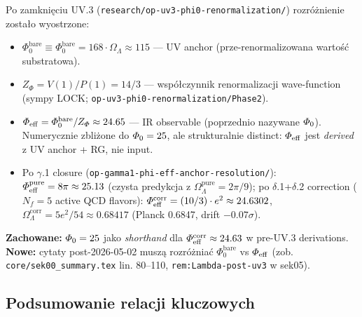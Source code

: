 \begin{remark}%
\label{rem:slownik-uv3-update}
Po zamknięciu UV.3 (\texttt{research/op-uv3-phi0-renormalization/}) rozróżnienie zostało wyostrzone:
\begin{itemize}[nosep]
  \item $\Phi_0^{\text{bare}} \equiv \Phi_0^{\text{bare}} = 168\cdot\Omega_\Lambda \approx 115$
        --- UV anchor (prze-renormalizowana wartość substratowa).
  \item $Z_\Phi = V(1)/P(1) = 14/3$ --- współczynnik renormalizacji
        wave-function (sympy LOCK; \texttt{op-uv3-phi0-renormalization/Phase2}).
  \item $\varPhi_{\mathrm{eff}} = \varPhi_0^{\text{bare}}/Z_\varPhi \approx 24.65$ --- IR observable
        (poprzednio nazywane \emph{$\varPhi_0$}). Numerycznie zbliżone
        do $\varPhi_0=25$, ale strukturalnie distinct: $\varPhi_{\mathrm{eff}}$ jest
        \emph{derived} z UV anchor + RG, nie input.
  \item Po $\gamma$.1 closure (\texttt{op-gamma1-phi-eff-anchor-resolution/}):
        $\varPhi_{\mathrm{eff}}^{\text{pure}} = 8\pi \approx 25.13$ (czysta predykcja
        z $\Omega_\Lambda^{\text{pure}} = 2\pi/9$); po $\delta$.1+$\delta$.2 correction
        ($N_f = 5$ active QCD flavors): $\varPhi_{\mathrm{eff}}^{\text{corr}} = (10/3)\cdot e^2 \approx 24.6302$,
        $\Omega_\Lambda^{\text{corr}} = 5e^2/54 \approx 0.68417$ (Planck 0.6847, drift $-0.07\sigma$).
\end{itemize}
\textbf{Zachowane:} $\varPhi_0 = 25$ jako \emph{shorthand} dla
$\varPhi_{\mathrm{eff}}^{\text{corr}} \approx 24.63$ w pre-UV.3 derivations.
\textbf{Nowe:} cytaty post-2026-05-02 muszą rozróżniać $\Phi_0^{\text{bare}}$ vs $\varPhi_{\mathrm{eff}}$
(zob. \texttt{core/sek00\_summary.tex} lin. 80--110, \texttt{rem:Lambda-post-uv3} w sek05).
\end{remark}

\subsection{Podsumowanie relacji kluczowych}

